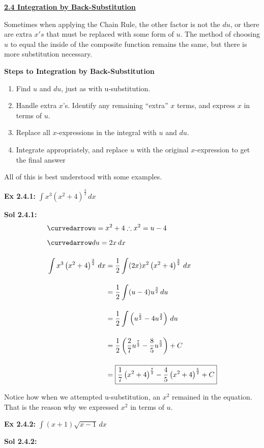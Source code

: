 \textbf{\underline{\large{2.4 Integration by Back-Substitution}}} \par

Sometimes when applying the Chain Rule, the other factor is not the $du$, or there are extra $x's$ that must be replaced with some form of $u$. The method of choosing $u$ to equal the inside of the composite function remains the same, but there is more substitution necessary. \par

\textbf{Steps to Integration by Back-Substitution} \par

\begin{enumerate}
    \item Find $u$ and $du$, just as with u-substitution.
    \item Handle extra $x$'s. Identify any remaining ``extra'' $x$ terms, and express $x$ in terms of $u$.
    \item Replace all $x$-expressions in the integral with $u$ and $du$.
    \item Integrate appropriately, and replace $u$ with the original $x$-expression to get the final answer
\end{enumerate} \vspace{11pt}

All of this is best understood with some examples.

\begin{tcolorbox}[example]
    \textbf{Ex 2.4.1: } $\int x^3\left(x^2 + 4\right)^{\frac{3}{2}} \, dx$
\end{tcolorbox}
\begin{tcolorbox}[solution]
    \textbf{Sol 2.4.1: } \begin{align*}
        & \curvedarrow u = x^2 + 4 \therefore x^2 = u - 4 \\[5.5pt]
        & \curvedarrow du = 2x \, dx \\[11pt]
        & \int x^3\left(x^2 + 4\right)^{\frac{3}{2}} \, dx \begin{aligned}[t]
            & = \dfrac{1}{2} \int (2x)x^2\left(x^2 + 4\right)^{\frac{3}{2}} \, dx \\[11pt]
            & = \dfrac{1}{2} \int (u - 4)u^{\frac{3}{2}} \, du \\[11pt]
            & = \dfrac{1}{2} \int \left(u^{\frac{5}{2}} - 4u^{\frac{3}{2}}\right) \, du \\[11pt]
            & = \dfrac{1}{2} \left(\dfrac{2}{7}u^{\frac{7}{2}} - \dfrac{8}{5}u^{\frac{5}{2}}\right) + C \\[11pt]
            & = \boxed{\dfrac{1}{7}\left(x^2 + 4\right)^{\frac{7}{2}} - \dfrac{4}{5}\left(x^2 + 4\right)^{\frac{5}{2}} + C}
        \end{aligned}
    \end{align*}

    Notice how when we attempted u-substitution, an $x^2$ remained in the equation. That is the reason why we expressed $x^2$ in terms of $u$.
\end{tcolorbox} \vspace{11pt}

\begin{tcolorbox}[example]
    \textbf{Ex 2.4.2: } $\int (x + 1)\sqrt{x - 1} \, dx$
\end{tcolorbox} 
\begin{tcolorbox}[solution]
    \textbf{Sol 2.4.2: }
\end{tcolorbox}